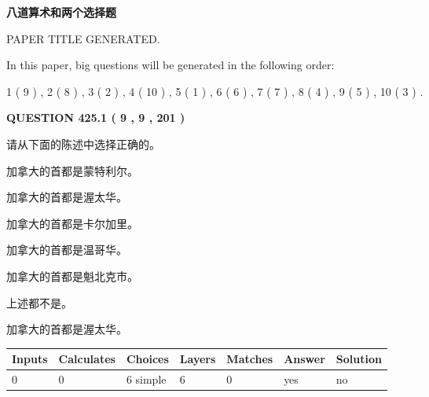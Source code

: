 \documentclass{ctexart}
\begin{document}
   
\vspace{0.2in}
   
   
   
   
   
   
   
   
 \vspace{0.2in}
{\LARGE {\textbf{ 八道算术和两个选择题}}}
   
   
 PAPER TITLE GENERATED.
   
   
   
\vspace{0.2in}
   
In this paper, big questions will be generated in the following order: 
   
   
   1 ( 9 )
 ,
   2 ( 8 )
 ,
   3 ( 2 )
 ,
   4 ( 10 )
 ,
   5 ( 1 )
 ,
   6 ( 6 )
 ,
   7 ( 7 )
 ,
   8 ( 4 )
 ,
   9 ( 5 )
 ,
   10 ( 3 )
 .
  
\vspace{0.2in}
  
{\textbf{\Large{QUESTION
425.1 
 ( 9 , 9 , 201 )
}}}
  
  
请从下面的陈述中选择正确的。
 
 
加拿大的首都是蒙特利尔。
 
 
加拿大的首都是渥太华。
 
 
加拿大的首都是卡尔加里。
 
 
加拿大的首都是温哥华。
 
 
加拿大的首都是魁北克市。
 
 
 上述都不是。
 
 
\noindent{}
 
 
加拿大的首都是渥太华。
 
 
\noindent{}
 
 
   
   
   
   
\noindent\begin{tabular}{|l|l|l|l|l|l|l|}
 \hline
Inputs & Calculates & Choices & Layers & Matches & Answer & Solution \\ \hline
 0  & 
 0  & 
 6
  simple  
  & 
 6  & 
 0  & 
  yes & 
  no 
  \\ \hline
 \end{tabular}
   
\end{document}
